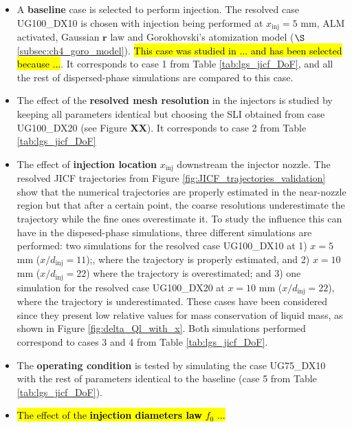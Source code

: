 \begin{itemize}

	\item A \textbf{baseline} case is selected to perform injection. The resolved case UG100\_DX10 is chosen with injection being performed at $x_\mathrm{inj} = 5$ mm, ALM activated, Gaussian $\textbf{r}$  law and Gorokhovski's atomization model ($\S$\ref{subsec:ch4_goro_model}). \hl{This case was studied in ... and has been selected because ...}. It corresponds to case 1 from Table \ref{tab:lgs_jicf_DoF}, and all the rest of dispersed-phase simulations are compared to this case.

		\item The effect of the \textbf{resolved mesh resolution} in the injectors is studied by keeping all parameters identical but choosing the SLI obtained from case UG100\_DX20 (see Figure \textbf{XX}). It corresponds to case 2 from Table \ref{tab:lgs_jicf_DoF}

	\item The effect of \textbf{injection location} $x_\mathrm{inj}$ downstream the injector nozzle. The resolved JICF trajectories from Figure \ref{fig:JICF_trajectories_validation} show that the numerical trajectories are properly estimated in the near-nozzle region but that after a certain point, the coarse resolutions underestimate the trajectory while the fine ones overestimate it. To study the influence this can have in the dispesed-phase simulations, three different simulations are performed: two simulations for the resolved case UG100\_DX10 at 1) $x = 5$ mm ($x/d_\mathrm{inj} = 11$);, where the trajectory is properly estimated, and 2) $x = 10$ mm ($x/d_\mathrm{inj} = 22$) where the trajectory is overestimated; and 3) one simulation for the resolved case UG100\_DX20 at $x = 10$ mm ($x/d_\mathrm{inj} = 22$), where the trajectory is underestimated. These cases have been considered since they present low relative values for mass conservation of liquid mass, as shown in Figure \ref{fig:delta_Ql_with_x}. Both simulations performed correspond to cases 3 and 4 from Table \ref{tab:lgs_jicf_DoF}.
	
	\item The \textbf{operating condition} is tested by simulating the case UG75\_DX10 with the rest of parameters identical to the baseline (case 5 from Table \ref{tab:lgs_jicf_DoF}).
	
	\item \hl{The effect of the \textbf{injection diameters law} $f_0$ ...}
	

\end{itemize}
